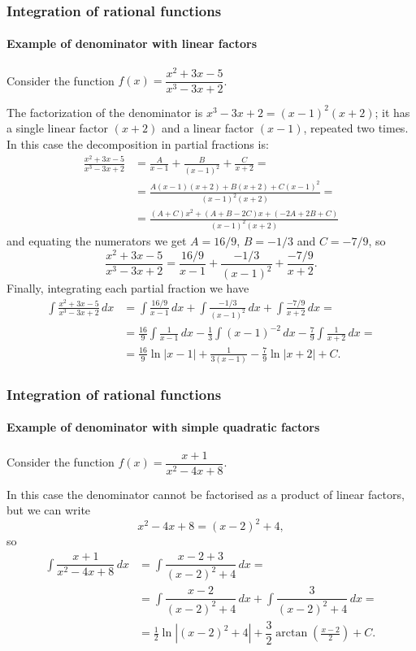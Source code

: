 \begin{frame}[allowframebreaks]
\frametitle{Integration of rational functions}
\framesubtitle{Example of denominator with linear factors}
Consider the function $f(x)=\dfrac{x^2+3x-5}{x^3-3x+2}$. 

The factorization of the denominator is $x^3-3x+2=(x-1)^2(x+2)$; it has a single linear factor $(x+2)$ and a linear factor $(x-1)$, repeated two times.
In this case the decomposition in partial fractions is:
\begin{align*}
\frac{x^2+3x-5}{x^3-3x+2}&=\frac{A}{x-1}+\frac{B}{(x-1)^2}+\frac{C}{x+2} = \\ &= \frac{A(x-1)(x+2)+ B(x+2)+C(x-1)^2}{(x-1)^2(x+2)} = \\ &= \frac{(A+C)x^2+(A+B-2C)x+(-2A+2B+C)}{(x-1)^2(x+2)}
\end{align*}
and equating the numerators we get $A=16/9$, $B=-1/3$ and $C=-7/9$, so
\[
\frac{x^2+3x-5}{x^3-3x+2}= \frac{16/9}{x-1}+\frac{-1/3}{(x-1)^2}+\frac{-7/9}{x+2}.
\]
Finally, integrating each partial fraction we have 
\begin{align*}
\int \frac{x^2+3x-5}{x^3-3x+2}\, dx &= \int \frac{16/9}{x-1}\,dx+\int \frac{-1/3}{(x-1)^2}\,dx+\int \frac{-7/9}{x+2}\,dx = \\ &=
\frac{16}{9}\int\frac{1}{x-1}\,dx-\frac{1}{3}\int(x-1)^{-2}\,dx- \frac{7}{9}\int \frac{1}{x+2}\,dx = \\
&= \frac{16}{9}\ln|x-1|+\frac{1}{3(x-1)}-\frac{7}{9}\ln|x+2|+C.
\end{align*}
\end{frame}


\begin{frame}
\frametitle{Integration of rational functions}
\framesubtitle{Example of denominator with simple quadratic factors}
Consider the function $f(x)=\dfrac{x+1}{x^2-4x+8}$. 

In this case the denominator cannot be factorised as a product of linear factors, but we can write
\[
x^2-4x+8 = (x-2)^2+4,
\]
so
\begin{align*}
\int \dfrac{x+1}{x^2-4x+8}\, dx &= \int \dfrac{x-2+3}{(x-2)^2+4}\,dx = \\
&= \int \dfrac{x-2}{(x-2)^2+4}\,dx + \int \dfrac{3}{(x-2)^2+4}\,dx = \\
&= \frac{1}{2}\ln|(x-2)^2+4| + \dfrac{3}{2}\arctan\left(\frac{x-2}{2}\right)+C.
\end{align*}
\end{frame}


